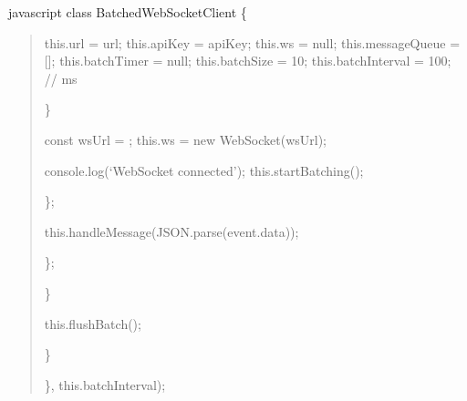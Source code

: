 \documentclass[letterpaper,10pt,english]{sphinxmanual}
\begin{document}
\sphinxAtStartPar
{\color{red}\bfseries{}\textasciigrave{}\textasciigrave{}}{\color{red}\bfseries{}\textasciigrave{}}javascript
class BatchedWebSocketClient \{
\begin{quote}
\begin{description}
\sphinxAtStartPar
this.url = url;
this.apiKey = apiKey;
this.ws = null;
this.messageQueue = {[}{]};
this.batchTimer = null;
this.batchSize = 10;
this.batchInterval = 100; // ms

\end{description}

\sphinxAtStartPar
\}
\begin{description}
\sphinxAtStartPar
const wsUrl = ;
this.ws = new WebSocket(wsUrl);
\begin{description}
\sphinxAtStartPar
console.log(‘WebSocket connected’);
this.startBatching();

\end{description}

\sphinxAtStartPar
\};
\begin{description}
\sphinxAtStartPar
this.handleMessage(JSON.parse(event.data));

\end{description}

\sphinxAtStartPar
\};

\end{description}

\sphinxAtStartPar
\}
\begin{description}
\begin{description}
\begin{description}
\sphinxAtStartPar
this.flushBatch();

\end{description}

\sphinxAtStartPar
\}

\end{description}

\sphinxAtStartPar
\}, this.batchInterval);

\end{description}


\end{quote}
\end{document}

